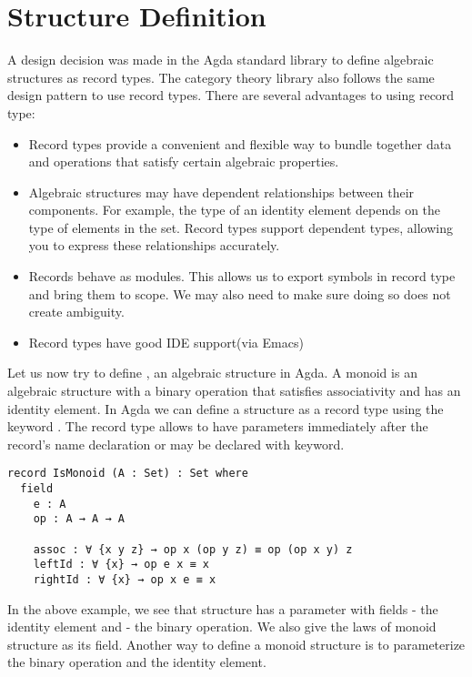 \section{Structure Definition}
A design decision was made in the Agda standard library to define algebraic
structures as record types. The category theory library \cite{hu2021formalizing}
also follows the same design pattern to use record types. There are several
advantages to using record type:
\begin{itemize}
  \item Record types provide a convenient and flexible way to bundle
  together data and operations that satisfy certain algebraic properties. 
  \item Algebraic structures may have dependent relationships between their
  components. For example, the type of an identity element depends on the type
  of elements in the set. Record types support dependent types,
  allowing you to express these relationships accurately.
  \item Records behave as modules. This allows us to export symbols in record
  type and bring them to scope. We may also need to make sure doing so does not
  create ambiguity.
  \item Record types have good IDE support(via Emacs)
\end{itemize}

Let us now try to define , an algebraic structure in Agda.
A monoid is an algebraic structure with a binary operation that satisfies
associativity and has an identity element. In Agda we can define a structure as
a record type using the keyword . The record type allows to have
parameters immediately after the record's name declaration or may be declared
with  keyword.

\begin{verbatim}
record IsMonoid (A : Set) : Set where
  field
    e : A           
    op : A → A → A  

    assoc : ∀ {x y z} → op x (op y z) ≡ op (op x y) z
    leftId : ∀ {x} → op e x ≡ x
    rightId : ∀ {x} → op x e ≡ x  
\end{verbatim}

In the above example, we see that  structure has a parameter
 with fields  - the identity element and  -
the binary operation. We also give the laws of monoid structure as its field.
Another way to define a monoid structure is to parameterize the binary operation
and the identity element.

